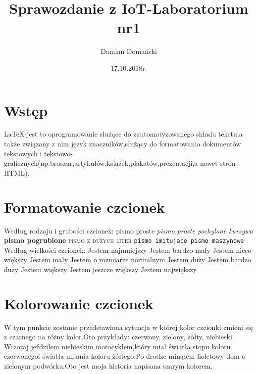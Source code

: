 \documentclass[11pt,a4paper]{article}
\title{Sprawozdanie z IoT-Laboratorium nr1}
\author{Damian Domański}
\date{17.10.2018r.}
\begin{document}
 
\section{Wstęp}\label{sec:begin}
LaTeX-jest to oprogramowanie służące do zautomatyzowanego składu tekstu,a także związany z nim język znaczników,służący do formatowania dokumentów tekstowych i tekstowo-graficznych(np.broszur,artykułów,książek,plakatów,prezentacji,a nawet stron HTML).
\section{Formatowanie czcionek}\label{sec:form}
Według rodzaju i grubości czcionek:\newline\newline
\textrm{pismo proste}\newline
\textsl{pismo proste pochylone}\newline
\textit{kursywa}\newline
\textbf{pismo pogrubione}\newline
\textsc{pismo z dużych liter}\newline
\texttt{pismo imitujące pismo maszynowe}\newline\newline
Według wielkości czcionek:\newline\newline
{\tiny Jestem najmniejszy}\newline
{\scriptsize Jestem bardzo mały}\newline
{\footnotesize Jestem nieco większy}\newline
{\small Jestem mały}\newline
{\normalsize Jestem o rozmiarze normalnym}\newline
{\large Jestem duży}\newline
{\Large Jestem bardzo duży}\newline
{\LARGE Jestem większy}\newline
{\huge Jestem jeszcze większy}\newline
{\Huge Jestem największy}\newline
\section{Kolorowanie czcionek}\label{sec:kolor}
W tym punkcie zostanie przedstawiona sytuacja w której kolor czcionki zmieni się z czarnego na różny kolor.Oto przykłady:\newline
{\color{red}czerwony,}
{\color{green}zielony,}
{\color{yellow}żółty,}
{\color{blue}niebieski.}\newline
Wczoraj jeździłem {\color{blue}niebieskim motocyklem},który miał światła stopu {\color{red}koloru czerwonego}i światła mijania {\color{yellow}koloru żółtego}.\newline Po drodze minąłem {\color{violet}fioletowy dom} o {\color{green}zielonym podwórku.}\newline Oto jest {\color{gray}moja historia napisana szarym kolorem.}\newline\newline
\end{document}
